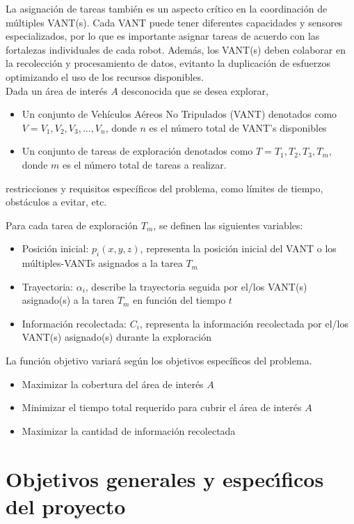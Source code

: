 \documentclass[11pt,epsf,times]{article}
\begin{document}
La asignación de tareas también es un aspecto crítico en la coordinación de múltiples VANT(s). Cada VANT puede tener diferentes capacidades y sensores especializados, por lo que es importante asignar tareas de acuerdo con las fortalezas individuales de cada robot. Además, los VANT(s) deben colaborar en la recolección y procesamiento de datos, evitanto la duplicación de esfuerzos optimizando el uso de los recursos disponibles.\\

Dada un área de interés $A$ desconocida que se desea explorar,
\begin{itemize}
\item Un conjunto de Vehículos Aéreos No Tripulados (VANT) denotados como $V = V_{1},V_{2},V_{3},...,V_{n}$, donde $n$ es el número total de VANT's disponibles
\item Un conjunto de tareas de exploración denotados como $T = T_{1}, T_{2}, T_{3}, T_{m}$, donde $m$ es el número total de tareas a realizar.
\end{itemize}

restricciones y requisitos específicos del problema, como límites de tiempo, obstáculos a evitar, etc.

Para cada tarea de exploración $T_{m}$, se definen las siguientes variables:

\begin{itemize}
\item Posición inicial: $p_{i}(x,y,z)$, representa la posición inicial del VANT o los múltiples-VANTs asignados a la tarea $T_{m}$
\item Trayectoria: $\alpha_{i}$, describe la trayectoria seguida por el/los VANT(s) asignado(s) a la tarea $T_{m}$ en función del tiempo $t$
\item Información recolectada: $C_{i}$, representa la información recolectada por el/los VANT(s) asignado(s) durante la exploración
\end{itemize}

La función objetivo variará según los objetivos específicos del problema.
\begin{itemize}
\item Maximizar la cobertura del área de interés $A$
\item Minimizar el tiempo total requerido para cubrir el área de interés $A$
\item Maximizar la cantidad de información recolectada
\end{itemize}

\newpage
\section{Objetivos generales y espec\'{\i}ficos del proyecto}
\end{document}
